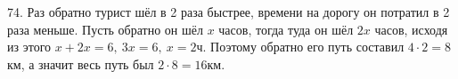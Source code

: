 74. Раз обратно турист шёл в 2 раза быстрее, времени на дорогу он потратил в 2 раза меньше. Пусть обратно он шёл $x$ часов, тогда туда он шёл $2x$ часов, исходя из этого $x+2x=6,\ 3x=6,\ x=2$ч. Поэтому обратно его путь составил $4\cdot2=8$км, а значит весь путь был $2\cdot8=16$км.\\
